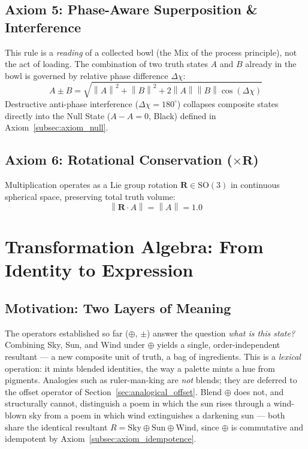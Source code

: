 \documentclass[12pt, a4paper]{article}
\providecommand{\norm}[1]{\left\lVert#1\right\rVert}
\begin{document}
\subsection{Axiom 5: Phase-Aware Superposition \& Interference}
\label{subsec:axiom_interference}
This rule is a \emph{reading} of a collected bowl (the Mix of the process principle), not the act of loading. The combination of two truth states $A$ and $B$ already in the bowl is governed by relative phase difference $\Delta\chi$:
\begin{equation}
    A \pm B = \sqrt{\norm{A}^2 + \norm{B}^2 + 2\norm{A}\norm{B}\cos(\Delta\chi)}
    \label{eq:interference_formal}
\end{equation}
Destructive anti-phase interference ($\Delta\chi = 180^\circ$) collapses composite states directly into the Null State ($A - A = 0$, Black) defined in Axiom~\ref{subsec:axiom_null}.

\subsection{Axiom 6: Rotational Conservation (\texorpdfstring{$\times \mathbf{R}$}{x R})}
\label{subsec:axiom_rotation}
Multiplication operates as a Lie group rotation $\mathbf{R} \in \mathrm{SO}(3)$ in continuous spherical space, preserving total truth volume:
\begin{equation}
    \norm{\mathbf{R} \cdot A} = \norm{A} = 1.0
\end{equation}

\section{Transformation Algebra: From Identity to Expression}
\label{sec:transformation_algebra}

\subsection{Motivation: Two Layers of Meaning}
\label{subsec:transform_motivation}
The operators established so far ($\oplus$, $\pm$) answer the question
\emph{what is this state?} Combining Sky, Sun, and Wind under $\oplus$
yields a single, order-independent resultant --- a new composite unit
of truth, a bag of ingredients. This is a \emph{lexical} operation: it mints blended identities, the way
a palette mints a hue from pigments. Analogies such as ruler-man-king are \emph{not} blends; they are deferred to the offset operator of Section~\ref{sec:analogical_offset}. Blend $\oplus$ does not, and structurally
cannot, distinguish a poem in which the sun rises through a wind-blown
sky from a poem in which wind extinguishes a darkening sun --- both
share the identical resultant
$R = \text{Sky} \oplus \text{Sun} \oplus \text{Wind}$, since $\oplus$
is commutative and idempotent by Axiom~\ref{subsec:axiom_idempotence}.
\end{document}
